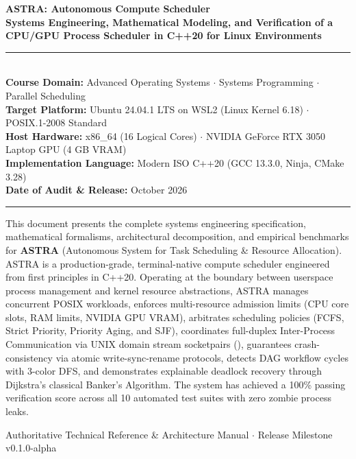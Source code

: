 \documentclass[11pt,a4paper]{article}
\DeclareRobustCommand{\code}[1]{\texttt{\detokenize{#1}}}
\begin{document}
\begin{titlepage}
    \centering
    \vspace*{1.0cm}
    
    {\Huge \textbf{\color{astraDark} ASTRA: Autonomous Compute Scheduler}}\\[0.4cm]
    {\LARGE \textbf{\color{astraBlue} Systems Engineering, Mathematical Modeling, and Verification of a CPU/GPU Process Scheduler in C++20 for Linux Environments}}\\[1.2cm]
    
    \rule{\linewidth}{1.2pt}\\[0.5cm]
    
    \textbf{Course Domain:} Advanced Operating Systems $\cdot$ Systems Programming $\cdot$ Parallel Scheduling\\
    \textbf{Target Platform:} Ubuntu 24.04.1 LTS on WSL2 (Linux Kernel 6.18) $\cdot$ POSIX.1-2008 Standard\\
    \textbf{Host Hardware:} x86\_64 (16 Logical Cores) $\cdot$ NVIDIA GeForce RTX 3050 Laptop GPU (4 GB VRAM)\\
    \textbf{Implementation Language:} Modern ISO C++20 (GCC 13.3.0, Ninja, CMake 3.28)\\
    \textbf{Date of Audit \& Release:} October 2026\\[0.5cm]
    \rule{\linewidth}{1.2pt}
    
    \vspace{1.5cm}
    
    \begin{tcolorbox}[colback=codeBg,colframe=astraBlue,title=\textbf{Executive Abstract}]
    This document presents the complete systems engineering specification, mathematical formalisms, architectural decomposition, and empirical benchmarks for \textbf{ASTRA} (Autonomous System for Task Scheduling \& Resource Allocation). ASTRA is a production-grade, terminal-native compute scheduler engineered from first principles in C++20. Operating at the boundary between userspace process management and kernel resource abstractions, ASTRA manages concurrent POSIX workloads, enforces multi-resource admission limits (CPU core slots, RAM limits, NVIDIA GPU VRAM), arbitrates scheduling policies (FCFS, Strict Priority, Priority Aging, and SJF), coordinates full-duplex Inter-Process Communication via UNIX domain stream socketpairs (\code{AF_UNIX}), guarantees crash-consistency via atomic write-sync-rename protocols, detects DAG workflow cycles with 3-color DFS, and demonstrates explainable deadlock recovery through Dijkstra's classical Banker's Algorithm. The system has achieved a 100\% passing verification score across all 10 automated test suites with zero zombie process leaks.
    \end{tcolorbox}
    
    \vfill
    
    {\small Authoritative Technical Reference \& Architecture Manual $\cdot$ Release Milestone v0.1.0-alpha}
\end{titlepage}
\end{document}
